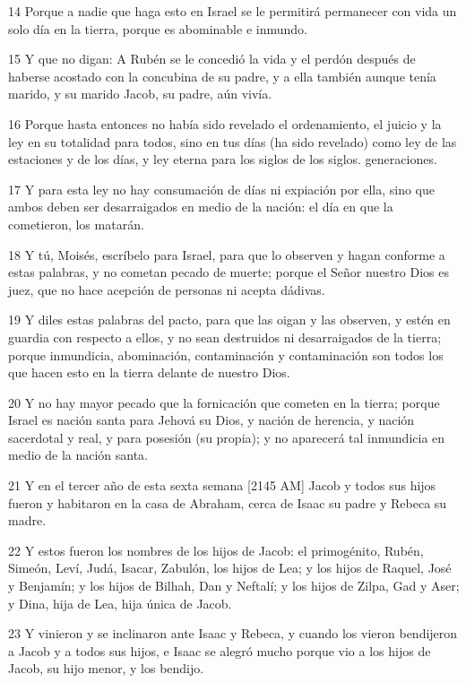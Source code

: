 \par 14 Porque a nadie que haga esto en Israel se le permitirá permanecer con vida un solo día en la tierra, porque es abominable e inmundo.
\par 15 Y que no digan: A Rubén se le concedió la vida y el perdón después de haberse acostado con la concubina de su padre, y a ella también aunque tenía marido, y su marido Jacob, su padre, aún vivía.
\par 16 Porque hasta entonces no había sido revelado el ordenamiento, el juicio y la ley en su totalidad para todos, sino en tus días (ha sido revelado) como ley de las estaciones y de los días, y ley eterna para los siglos de los siglos. generaciones.
\par 17 Y para esta ley no hay consumación de días ni expiación por ella, sino que ambos deben ser desarraigados en medio de la nación: el día en que la cometieron, los matarán.
\par 18 Y tú, Moisés, escríbelo para Israel, para que lo observen y hagan conforme a estas palabras, y no cometan pecado de muerte; porque el Señor nuestro Dios es juez, que no hace acepción de personas ni acepta dádivas.
\par 19 Y diles estas palabras del pacto, para que las oigan y las observen, y estén en guardia con respecto a ellos, y no sean destruidos ni desarraigados de la tierra; porque inmundicia, abominación, contaminación y contaminación son todos los que hacen esto en la tierra delante de nuestro Dios.
\par 20 Y no hay mayor pecado que la fornicación que cometen en la tierra; porque Israel es nación santa para Jehová su Dios, y nación de herencia, y nación sacerdotal y real, y para posesión (su propia); y no aparecerá tal inmundicia en medio de la nación santa.
\par 21 Y en el tercer año de esta sexta semana [2145 AM] Jacob y todos sus hijos fueron y habitaron en la casa de Abraham, cerca de Isaac su padre y Rebeca su madre.
\par 22 Y estos fueron los nombres de los hijos de Jacob: el primogénito, Rubén, Simeón, Leví, Judá, Isacar, Zabulón, los hijos de Lea; y los hijos de Raquel, José y Benjamín; y los hijos de Bilhah, Dan y Neftalí; y los hijos de Zilpa, Gad y Aser; y Dina, hija de Lea, hija única de Jacob.
\par 23 Y vinieron y se inclinaron ante Isaac y Rebeca, y cuando los vieron bendijeron a Jacob y a todos sus hijos, e Isaac se alegró mucho porque vio a los hijos de Jacob, su hijo menor, y los bendijo.


